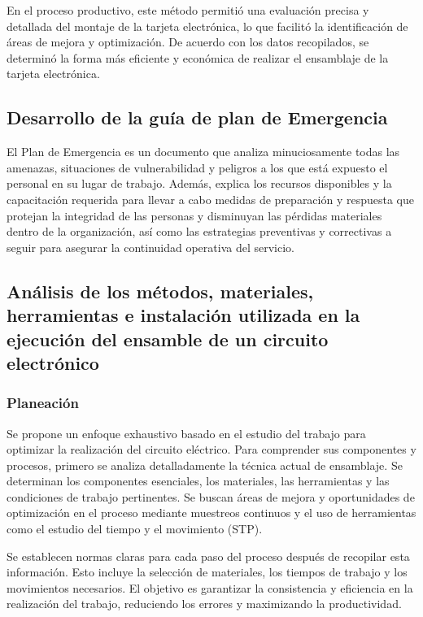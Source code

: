 En el proceso productivo, este método permitió una evaluación precisa y detallada del montaje de la tarjeta electrónica, lo que facilitó la identificación de áreas de mejora y optimización. De acuerdo con los datos recopilados, se determinó la forma más eficiente y económica de realizar el ensamblaje de la tarjeta electrónica.
% 
% 
\subsection{Desarrollo de la guía de plan de Emergencia}

El Plan de Emergencia es un documento que analiza minuciosamente todas las amenazas, situaciones de vulnerabilidad y peligros a los que está expuesto el personal en su lugar de trabajo. Además, explica los recursos disponibles y la capacitación requerida para llevar a cabo medidas de preparación y respuesta que protejan la integridad de las personas y disminuyan las pérdidas materiales dentro de la organización, así como las estrategias preventivas y correctivas a seguir para asegurar la continuidad operativa del servicio.
% 
% 
\subsection{Análisis de los métodos, materiales, herramientas e instalación utilizada en la ejecución del ensamble de un circuito electrónico}

\subsubsection{Planeación}

Se propone un enfoque exhaustivo basado en el estudio del trabajo para optimizar la realización del circuito eléctrico. Para comprender sus componentes y procesos, primero se analiza detalladamente la técnica actual de ensamblaje. Se determinan los componentes esenciales, los materiales, las herramientas y las condiciones de trabajo pertinentes. Se buscan áreas de mejora y oportunidades de optimización en el proceso mediante muestreos continuos y el uso de herramientas como el estudio del tiempo y el movimiento (STP).

Se establecen normas claras para cada paso del proceso después de recopilar esta información. Esto incluye la selección de materiales, los tiempos de trabajo y los movimientos necesarios. El objetivo es garantizar la consistencia y eficiencia en la realización del trabajo, reduciendo los errores y maximizando la productividad.

